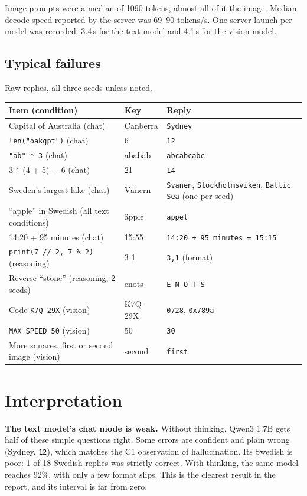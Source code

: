 \documentclass[11pt,a4paper]{article}
\newcommand{\code}[1]{\texttt{#1}}
\begin{document}
Image prompts were a median of 1090 tokens, almost all of it the image. Median decode
speed reported by the server was 69--90 tokens/s. One server launch per model was
recorded: 3.4\,s for the text model and 4.1\,s for the vision model.

\clearpage
\subsection*{Typical failures}
Raw replies, all three seeds unless noted.

\begin{table}[H]
\centering\small
\begin{tabularx}{\textwidth}{@{}llY@{}}
\toprule
Item (condition) & Key & Reply \\
\midrule
Capital of Australia (chat) & Canberra & \code{Sydney} \\
\code{len("oakgpt")} (chat) & 6 & \code{12} \\
\code{"ab" * 3} (chat) & ababab & \code{abcabcabc} \\
3 * (4 + 5) $-$ 6 (chat) & 21 & \code{14} \\
Sweden's largest lake (chat) & V\"anern & \code{Svanen}, \code{Stockholmsviken},
  \code{Baltic Sea} (one per seed) \\
``apple'' in Swedish (all text conditions) & \"apple & \code{appel} \\
14:20 + 95 minutes (chat) & 15:55 & \code{14:20 + 95 minutes = 15:15} \\
\code{print(7 // 2, 7 \% 2)} (reasoning) & 3 1 & \code{3,1} (format) \\
Reverse ``stone'' (reasoning, 2 seeds) & enots & \code{E-N-O-T-S} \\
Code \code{K7Q-29X} (vision) & K7Q-29X & \code{0728}, \code{0x789a} \\
\code{MAX SPEED 50} (vision) & 50 & \code{30} \\
More squares, first or second image (vision) & second & \code{first} \\
\bottomrule
\end{tabularx}
\end{table}

\section{Interpretation}\label{sec:interpretation}

\textbf{The text model's chat mode is weak.} Without thinking, Qwen3 1.7B gets half of
these simple questions right. Some errors are confident and plain wrong (Sydney,
\code{12}), which matches the C1 observation of hallucination. Its Swedish is poor: 1 of
18 Swedish replies was strictly correct. With thinking, the same model reaches 92\%,
with only a few format slips. This is the clearest result in the report, and its interval
is far from zero.
\end{document}

